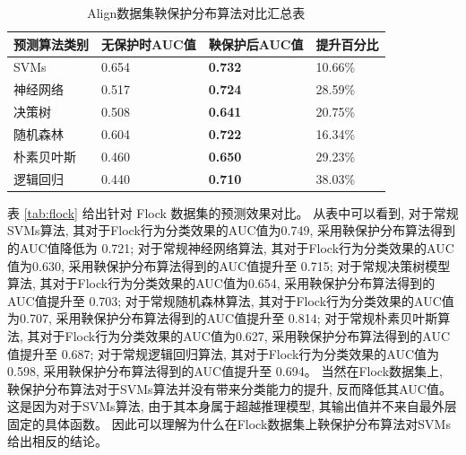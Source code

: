 \begin{table}[]
\centering
\caption{Align数据集鞅保护分布算法对比汇总表}
\label{tab:align}
\begin{tabular}{@{}llll@{}}
\toprule
预测算法类别 & 无保护时AUC值 & 鞅保护后AUC值 & 提升百分比 \\ \midrule
SVMs                & 0.654     & \textbf{0.732}  &  {10.66\%}  \\
神经网络       & 0.517     & \textbf{0.724}  &  {28.59\%}  \\
决策树        & 0.508     & \textbf{0.641}  &  {20.75\%} \\
随机森林        & 0.604     & \textbf{0.722}  &  {16.34\%} \\
朴素贝叶斯     & 0.460     & \textbf{0.650}  &  {29.23\%}  \\
逻辑回归  & 0.440     & \textbf{0.710}  &  {38.03\%}  \\ \bottomrule
\end{tabular}
\end{table}

表 \ref{tab:flock} 给出针对 Flock 数据集的预测效果对比。 从表中可以看到, 对于常规SVMs算法, 其对于Flock行为分类效果的AUC值为0.749, 采用鞅保护分布算法得到的AUC值降低为 0.721; 对于常规神经网络算法, 其对于Flock行为分类效果的AUC值为0.630, 采用鞅保护分布算法得到的AUC值提升至 0.715; 对于常规决策树模型算法, 其对于Flock行为分类效果的AUC值为0.654, 采用鞅保护分布算法得到的AUC值提升至 0.703; 对于常规随机森林算法, 其对于Flock行为分类效果的AUC值为0.707, 采用鞅保护分布算法得到的AUC值提升至 0.814; 对于常规朴素贝叶斯算法, 其对于Flock行为分类效果的AUC值为0.627, 采用鞅保护分布算法得到的AUC值提升至 0.687; 对于常规逻辑回归算法, 其对于Flock行为分类效果的AUC值为0.598, 采用鞅保护分布算法得到的AUC值提升至 0.694。 当然在Flock数据集上, 鞅保护分布算法对于SVMs算法并没有带来分类能力的提升, 反而降低其AUC值。 这是因为对于SVMs算法, 由于其本身属于超越推理模型, 其输出值并不来自最外层固定的具体函数。 因此可以理解为什么在Flock数据集上鞅保护分布算法对SVMs给出相反的结论。

